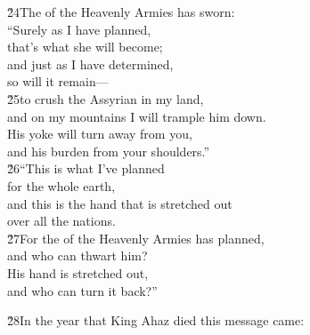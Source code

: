 \begin{poetry}
\poeml \v{24}The  of the Heavenly Armies has sworn: \\
\poeml ``Surely as I have planned, \\
\poemll    that's what she will become; \\
\poeml and just as I have determined, \\
\poemll    so will it remain--- \\
\poeml \v{25}to crush the Assyrian in my land, \\
\poemll    and on my mountains I will trample him down. \\
\poeml His yoke will turn away from you, \\
\poemll    and his burden from your shoulders.'' \\
\poeml \v{26}``This is what I've planned \\
\poemll    for the whole earth, \\
\poeml and this is the hand that is stretched out \\
\poemll    over all the nations. \\
\poeml \v{27}For the  of the Heavenly Armies has planned, \\
\poemll    and who can thwart him? \\
\poeml His hand is stretched out, \\
\poemll    and who can turn it back?''
\end{poetry}

\v{28}In the year that King Ahaz died this message came:

